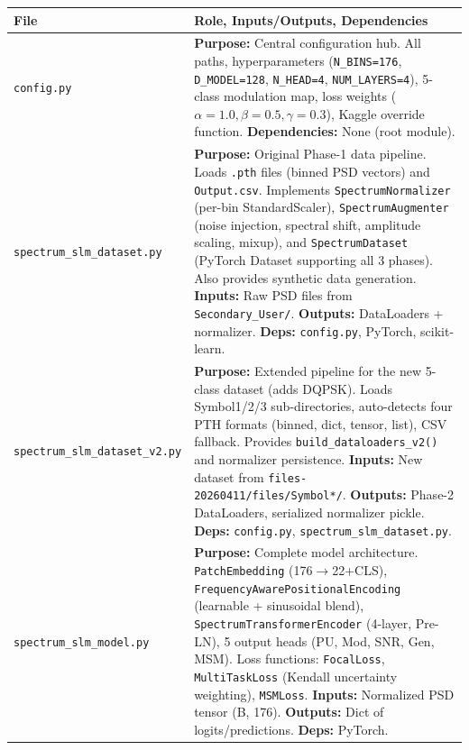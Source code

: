 \documentclass[12pt,a4paper]{article}
\begin{document}
\begin{longtable}{@{}p{}p{}@{}}
\toprule\textbf{File}&\textbf{Role, Inputs/Outputs, Dependencies}\\\midrule\endfirsthead\endhead

\texttt{config.py} &
\textbf{Purpose:} Central configuration hub. All paths, hyperparameters (\texttt{N\_BINS=176}, \texttt{D\_MODEL=128}, \texttt{N\_HEAD=4}, \texttt{NUM\_LAYERS=4}), 5-class modulation map, loss weights ($\alpha{=}1.0,\beta{=}0.5,\gamma{=}0.3$), Kaggle override function. \textbf{Dependencies:} None (root module).\\\midrule

\texttt{spectrum\_slm\_dataset.py} &
\textbf{Purpose:} Original Phase-1 data pipeline. Loads \texttt{.pth} files (binned PSD vectors) and \texttt{Output.csv}. Implements \texttt{SpectrumNormalizer} (per-bin StandardScaler), \texttt{SpectrumAugmenter} (noise injection, spectral shift, amplitude scaling, mixup), and \texttt{SpectrumDataset} (PyTorch Dataset supporting all 3 phases). Also provides synthetic data generation. \textbf{Inputs:} Raw PSD files from \texttt{Secondary\_User/}. \textbf{Outputs:} DataLoaders + normalizer. \textbf{Deps:} \texttt{config.py}, PyTorch, scikit-learn.\\\midrule

\texttt{spectrum\_slm\_dataset\_v2.py} &
\textbf{Purpose:} Extended pipeline for the new 5-class dataset (adds DQPSK). Loads Symbol1/2/3 sub-directories, auto-detects four PTH formats (binned, dict, tensor, list), CSV fallback. Provides \texttt{build\_dataloaders\_v2()} and normalizer persistence. \textbf{Inputs:} New dataset from \texttt{files-20260411/files/Symbol*/}. \textbf{Outputs:} Phase-2 DataLoaders, serialized normalizer pickle. \textbf{Deps:} \texttt{config.py}, \texttt{spectrum\_slm\_dataset.py}.\\\midrule

\texttt{spectrum\_slm\_model.py} &
\textbf{Purpose:} Complete model architecture. \texttt{PatchEmbedding} (176$\to$22+CLS), \texttt{FrequencyAwarePositionalEncoding} (learnable + sinusoidal blend), \texttt{SpectrumTransformerEncoder} (4-layer, Pre-LN), 5 output heads (PU, Mod, SNR, Gen, MSM). Loss functions: \texttt{FocalLoss}, \texttt{MultiTaskLoss} (Kendall uncertainty weighting), \texttt{MSMLoss}. \textbf{Inputs:} Normalized PSD tensor (B, 176). \textbf{Outputs:} Dict of logits/predictions. \textbf{Deps:} PyTorch.\\\midrule


\end{longtable}
\end{document}
